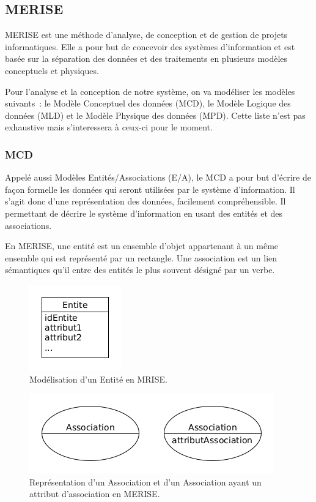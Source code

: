 \documentclass[12pt,a4paper]{article}
\begin{document}
	\newpage
	\subsection{MERISE}
	MERISE est une méthode d’analyse, de conception et de gestion de projets informatiques. Elle a pour but de concevoir des systèmes d’information et est basée sur la séparation des données et des traitements en plusieurs modèles conceptuels et physiques.
	
	Pour l’analyse et la conception de notre système, on va modéliser les modèles suivants : le Modèle Conceptuel des données (MCD), le Modèle Logique des données (MLD) et le Modèle Physique des données (MPD). Cette liste n'est pas exhaustive mais s'interessera à ceux-ci pour le moment.\\


	\subsubsection{MCD}
	Appelé aussi Modèles Entités/Associations (E/A), le MCD a pour but d'écrire de façon formelle les données qui seront utilisées par le système d'information. Il s'agit donc d'une représentation des données, facilement compréhensible. Il permettant de décrire le système d'information en usant des entités et des associations.
	
	En MERISE, une entité est un ensemble d'objet appartenant à un même ensemble qui est représenté par un rectangle. Une association est un lien sémantiques qu'il entre des entités le plus souvent désigné par un verbe.
	
	\begin{figure}[H]
		\centering
		\includegraphics[width=.25\textwidth]{entite}
		\caption{Modélisation d'un Entité en MRISE.}
		\label{fig:figure5}
	\end{figure}

	\begin{figure}[H]
	\centering
	\includegraphics[width=.75\textwidth]{association}
	\caption{Représentation d'un Association et d'un Association ayant un attribut d'association en MERISE.}
	\label{fig:figure5.5}
	\end{figure}
\end{document}
